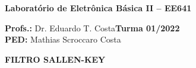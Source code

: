 \documentclass[addpoints]{exam}
\begin{document}
 
\large

\begin{center}
\Large
\textbf{Laboratório de Eletrônica Básica II – EE641}
\end{center}

\large
\vspace{2mm}

\noindent\textbf{Profs.:} Dr. Eduardo T. Costa\hfill \textbf{Turma 01/2022} \\
\textbf{PED:} Mathias Scroccaro Costa \hfill %

\normalsize
 
\vspace{5mm}
 

 
\noindent{}
\hfill
{}

\vspace{5mm}

\noindent{}
\hfill
{}

\vspace{5mm}

\noindent{}
\hfill
{}



\vspace{2mm}


\begin{center}
\large
\textbf{FILTRO SALLEN-KEY}
\normalsize
\end{center}
\end{document}

